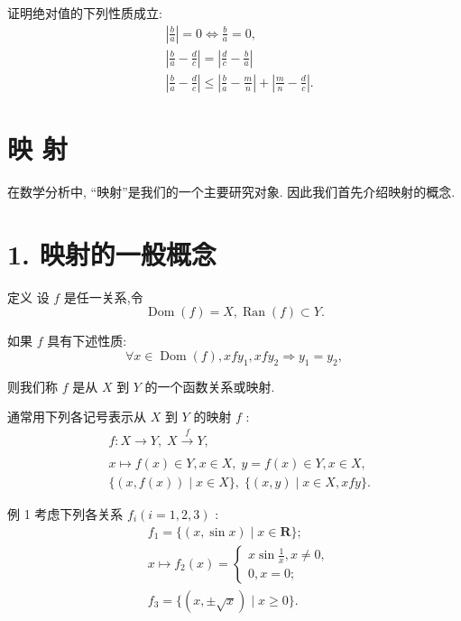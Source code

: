 证明绝对值的下列性质成立:
\begin{align*}
	&\left| \frac{b}{a}\right|  = 0 \Leftrightarrow  \frac{b}{a} = 0,\\
	&\left| {\frac{b}{a} - \frac{d}{c}}\right|  = \left| {\frac{d}{c} - \frac{b}{a}}\right|\\
	&\left| {\frac{b}{a} - \frac{d}{c}}\right|  \leq  \left| {\frac{b}{a} - \frac{m}{n}}\right|  + \left| {\frac{m}{n} - \frac{d}{c}}\right| .
\end{align*}

\section{映 射}

在数学分析中, “映射”是我们的一个主要研究对象. 因此我们首先介绍映射的概念.

\section*{1. 映射的一般概念}

定义 设 $f$ 是任一关系,令
$$\operatorname{Dom}\left( f\right)  = X,\operatorname{Ran}\left( f\right)  \subset  Y.$$

如果 $f$ 具有下述性质:
$$\forall x \in  \operatorname{Dom}\left( f\right) ,{xf}{y}_{1},{xf}{y}_{2} \Rightarrow  {y}_{1} = {y}_{2},$$

则我们称 $f$ 是从 $X$ 到 $Y$ 的一个函数关系或映射.

通常用下列各记号表示从 $X$ 到 $Y$ 的映射 $f$ :
\begin{align*}
	&f : X \rightarrow  Y,\;X\xrightarrow[]{f}Y,\\
	&x \mapsto  f\left( x\right)  \in  Y,x \in  X,\;y = f\left( x\right)  \in  Y,x \in  X,\\
	&\{ \left( {x,f\left( x\right) }\right)  \mid  x \in  X\} ,\;\{ \left( {x,y}\right)  \mid  x \in  X,{xfy}\} .
\end{align*}

例 1 考虑下列各关系 ${f}_{i}\left( {i = 1,2,3}\right)$ :
\begin{align*}
	&{f}_{1} = \{ \left( {x,\sin x}\right)  \mid  x \in  \mathbf{R}\} ;\\
	&x \mapsto  {f}_{2}\left( x\right)  = \left\{  \begin{array}{l} x\sin \frac{1}{x},x \neq  0, \\  0,x = 0; \end{array}\right.\\
	&{f}_{3} = \{ \left( {x, \pm  \sqrt{x}}\right)  \mid  x \geq  0\} .
\end{align*}

